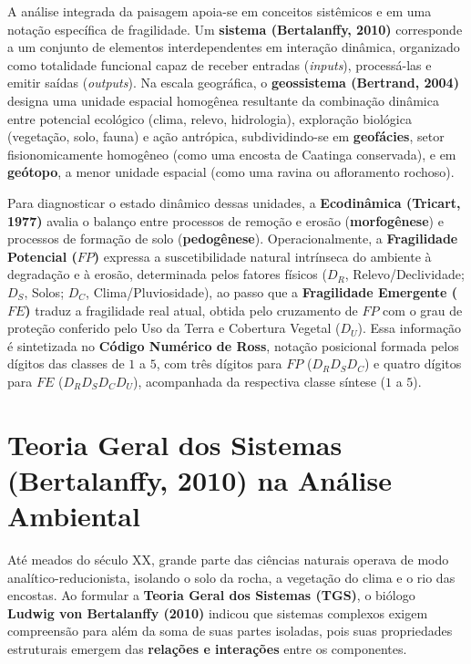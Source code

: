 \begin{boxSimbolo}
A análise integrada da paisagem apoia-se em conceitos sistêmicos e em uma notação específica de fragilidade. Um \textbf{sistema (Bertalanffy, 2010)} corresponde a um conjunto de elementos interdependentes em interação dinâmica, organizado como totalidade funcional capaz de receber entradas (\textit{inputs}), processá-las e emitir saídas (\textit{outputs}). Na escala geográfica, o \textbf{geossistema (Bertrand, 2004)} designa uma unidade espacial homogênea resultante da combinação dinâmica entre potencial ecológico (clima, relevo, hidrologia), exploração biológica (vegetação, solo, fauna) e ação antrópica, subdividindo-se em \textbf{geofácies}, setor fisionomicamente homogêneo (como uma encosta de Caatinga conservada), e em \textbf{geótopo}, a menor unidade espacial (como uma ravina ou afloramento rochoso).

Para diagnosticar o estado dinâmico dessas unidades, a \textbf{Ecodinâmica (Tricart, 1977)} avalia o balanço entre processos de remoção e erosão (\textbf{morfogênese}) e processos de formação de solo (\textbf{pedogênese}). Operacionalmente, a \textbf{Fragilidade Potencial ($FP$)} expressa a suscetibilidade natural intrínseca do ambiente à degradação e à erosão, determinada pelos fatores físicos ($D_R$, Relevo/Declividade; $D_S$, Solos; $D_C$, Clima/Pluviosidade), ao passo que a \textbf{Fragilidade Emergente ($FE$)} traduz a fragilidade real atual, obtida pelo cruzamento de $FP$ com o grau de proteção conferido pelo Uso da Terra e Cobertura Vegetal ($D_U$). Essa informação é sintetizada no \textbf{Código Numérico de Ross}, notação posicional formada pelos dígitos das classes de $1$ a $5$, com três dígitos para $FP$ ($D_R D_S D_C$) e quatro dígitos para $FE$ ($D_R D_S D_C D_U$), acompanhada da respectiva classe síntese ($1$ a $5$).
\end{boxSimbolo}

\section{Teoria Geral dos Sistemas (Bertalanffy, 2010) na Análise Ambiental}

Até meados do século XX, grande parte das ciências naturais operava de modo analítico-reducionista, isolando o solo da rocha, a vegetação do clima e o rio das encostas. Ao formular a \textbf{Teoria Geral dos Sistemas (TGS)}, o biólogo \textbf{Ludwig von Bertalanffy (2010)} indicou que sistemas complexos exigem compreensão para além da soma de suas partes isoladas, pois suas propriedades estruturais emergem das \textbf{relações e interações} entre os componentes.

